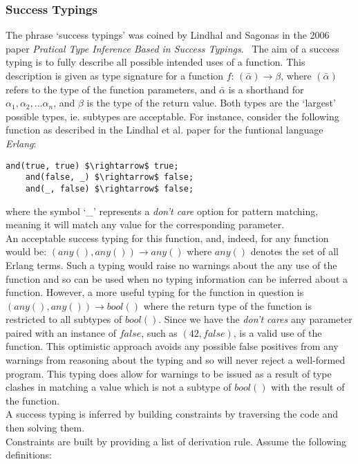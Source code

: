 \documentclass[12pt, titlepage]{article}
\begin{document}
\subsubsection*{Success Typings}
The phrase `success typings' was coined by Lindhal and Sagonas in the 2006 paper \textit{Pratical Type Inference Based in Success Typings}.~\cite{lindhal06} The aim of a success typing is to fully describe all possible intended uses of a function. This description is given as type signature for a function $f$: $(\bar{\alpha}) \rightarrow \beta$, where $(\bar{\alpha})$ refers to the type of the function parameters, and $\bar{\alpha}$ is a shorthand for $\alpha_1, \alpha_2,...\alpha_n$, and $\beta$ is the type of the return value. Both types are the `largest' possible types, ie. subtypes are acceptable. For instance, consider the following function as described in the Lindhal et al. paper for the funtional language \textit{Erlang}:
\begin{lstlisting}[mathescape]
	and(true, true) $\rightarrow$ true;
	and(false, _) $\rightarrow$ false;
	and(_, false) $\rightarrow$ false;
\end{lstlisting}
where the symbol `\_' represents a \textit{don't care} option for pattern matching, meaning it will match any value for the corresponding parameter. \\
An acceptable success typing for this function, and, indeed, for any function would be: $(any(), any()) \rightarrow any()$ where $any()$ denotes the set of all Erlang terms. Such a typing would raise no warnings about the any use of the function and so can be used when no typing information can be inferred about a function. However, a more useful typing for the function in question is $(any(), any()) \rightarrow bool()$ where the return type of the function is restricted to all subtypes of $bool()$. Since we have the \textit{don't cares} any parameter paired with an instance of $false$, such as $(42, false)$, is a valid use of the function. This optimistic approach avoids any possible false positives from any warnings from reasoning about the typing and so will never reject a well-formed program. This typing does allow for warnings to be issued as a result of type clashes in matching a value which is not a subtype of $bool()$ with the result of the function. \\
A success typing is inferred by building constraints by traversing the code and then solving them. \\
Constraints are built by providing a list of derivation rule. Assume the following definitions:
\end{document}
